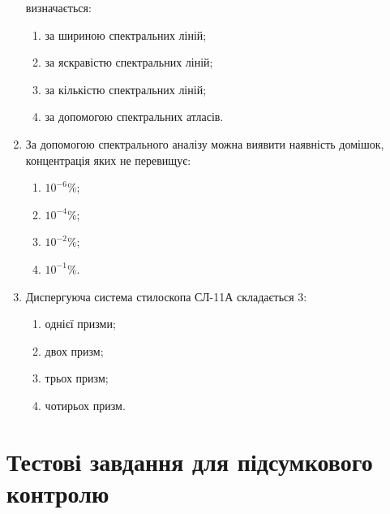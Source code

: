 \documentclass[twocolumn]{el-author}
\begin{document}
\begin{enumerate}
визначається:
	\begin{enumerate}
		\item за шириною спектральних ліній;
		\item за яскравістю спектральних ліній;
		\item за кількістю спектральних ліній;
		\item за допомогою спектральних атласів.
	\end{enumerate}
	\item За допомогою спектрального аналізу можна виявити наявність домішок,
концентрація яких не перевищує:
	\begin{enumerate}
		\item $10^{-6}\%$;
		\item $10^{-4}\%$;
		\item $10^{-2}\%$;
		\item $10^{-1}\%$.
	\end{enumerate}
	\item Диспергуюча система стилоскопа СЛ-11А складається 3:
	\begin{enumerate}
		\item однієї призми;
		\item двох призм;
		\item трьох призм;
		\item чотирьох призм.
	\end{enumerate}
\end{enumerate}

\newpage

\section{Тестові завдання для підсумкового контролю}
\end{document}

